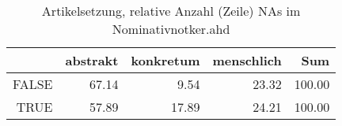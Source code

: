 \begin{table}[ht]
\centering
\begin{tabular}{rrrrr}
  \hline
 & abstrakt & konkretum & menschlich & Sum \\ 
  \hline
FALSE & 67.14 & 9.54 & 23.32 & 100.00 \\ 
  TRUE & 57.89 & 17.89 & 24.21 & 100.00 \\ 
   \hline
\end{tabular}
\caption{Artikelsetzung, relative Anzahl (Zeile) NAs im Nominativnotker.ahd} 
\end{table}
